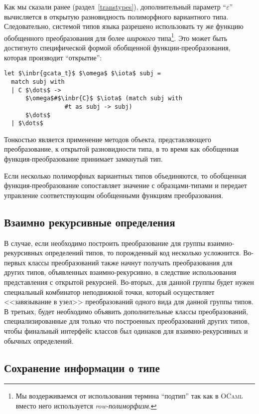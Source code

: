 Как мы сказали ранее (раздел~\ref{transtypes}), дополнительный параметр  ``$\varepsilon$'' вычисляется в открытую разновидность полиморфного вариантного типа. Следовательно, системой типов языка \OCaml{} разрешено использовать ту же функцию обобщенного преобразования для более \emph{широкого} типа\footnote{Мы воздерживаемся от использования термина ``подтип'' так как в \textsc{OCaml} вместо него используется \emph{row-полиморфизм}.}. 
Это может быть достигнуто специфической формой обобщенной функции-преобразования, которая производит ``открытие'':

\begin{lstlisting}
let $\inbr{gcata_t}$ $\omega$ $\iota$ subj =
  match subj with
  | C $\dots$ -> 
      $\omega$#$\inbr{C}$ $\iota$ (match subj with 
                 #t as subj -> subj) 
      $\dots$
  | $\dots$
\end{lstlisting}

Тонкостью является применение методов объекта, представляющего преобразование, к открытой разновидности типа, в то время как обобщенная функция-преобразование принимает замкнутый тип.

Если несколько полиморфных вариантных типов объединяются, то обобщенная функция-преобразование сопоставляет значение с образцами-типами и передает управление соответствующим обобщенными функциям преобразования.



\subsection{Взаимно рекурсивные определения}
\label{murec}

В случае, если необходимо построить преобразование для группы взаимно-рекурсивных определений типов, то порожденный код несколько усложнится. Во-первых классы преобразований также начнут получать преобразования для других типов, объявленных взаимно-рекурсивно, в следствие использования представления с открытой рекурсией. Во-вторых, для данной группы будет нужен специальный комбинатор неподвижной точки, который осуществляет <<завязывание в узел>> преобразований одного вида для данной группы типов. В третьих, будет необходимо объявить дополнительные классы преобразований, специализированные для только что построенных преобразований других типов, чтобы финальный интерфейс классов был одинаков для взаимно-рекурсивных и обычных определений.


\subsection{Сохранение информации о типе}
\label{typeinfo}


